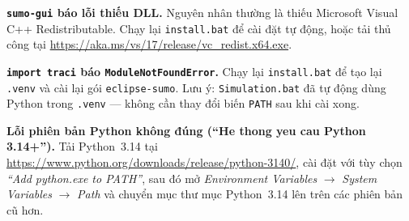\documentclass[../DoAn.tex]{subfiles}
\begin{document}
\textbf{\texttt{sumo-gui} báo lỗi thiếu DLL.}
Nguyên nhân thường là thiếu Microsoft Visual C++ Redistributable.
Chạy lại \texttt{install.bat} để cài đặt tự động, hoặc tải thủ công tại
\url{https://aka.ms/vs/17/release/vc_redist.x64.exe}.

\textbf{\texttt{import traci} báo \texttt{ModuleNotFoundError}.}
Chạy lại \texttt{install.bat} để tạo lại \texttt{.venv} và cài lại gói \texttt{eclipse-sumo}.
Lưu ý: \texttt{Simulation.bat} đã tự động dùng Python trong \texttt{.venv} —
không cần thay đổi biến \texttt{PATH} sau khi cài xong.

\textbf{Lỗi phiên bản Python không đúng (``He thong yeu cau Python 3.14+'').}
Tải Python~3.14 tại \url{https://www.python.org/downloads/release/python-3140/},
cài đặt với tùy chọn \textit{``Add python.exe to PATH''}, sau đó mở
\textit{Environment Variables} $\to$ \textit{System Variables} $\to$ \textit{Path}
và chuyển mục thư mục Python~3.14 lên trên các phiên bản cũ hơn.
\end{document}
